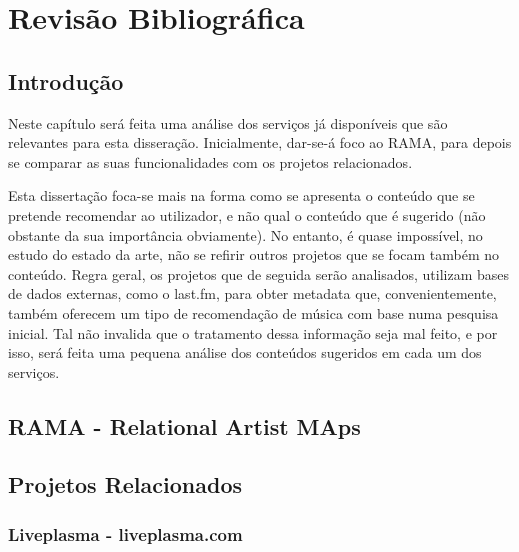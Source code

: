 
\chapter{Revisão Bibliográfica} \label{chap:chap2}

\section*{}

\section{Introdução}

Neste capítulo será feita uma análise dos serviços já disponíveis que são relevantes para esta disseração.
Inicialmente, dar-se-á foco ao RAMA, para depois se comparar as suas funcionalidades com os projetos relacionados.

Esta dissertação foca-se mais na forma como se apresenta o conteúdo que se pretende recomendar ao utilizador, e não qual o conteúdo que é sugerido (não obstante da sua importância obviamente).
No entanto, é quase impossível, no estudo do estado da arte, não se refirir outros projetos que se focam também no conteúdo.
Regra geral, os projetos que de seguida serão analisados, utilizam bases de dados externas, como o last.fm, para obter metadata que, convenientemente, também oferecem um tipo de recomendação de música com base numa pesquisa inicial.
Tal não invalida que o tratamento dessa informação seja mal feito, e por isso, será feita uma pequena análise dos conteúdos sugeridos em cada um dos serviços.

\section{RAMA - Relational Artist MAps} %
\label{sec:rama}


\section{Projetos Relacionados} %
\label{sec:projetos_relacionados}


\subsection{Liveplasma - liveplasma.com} %
\label{sub:liveplasma}

